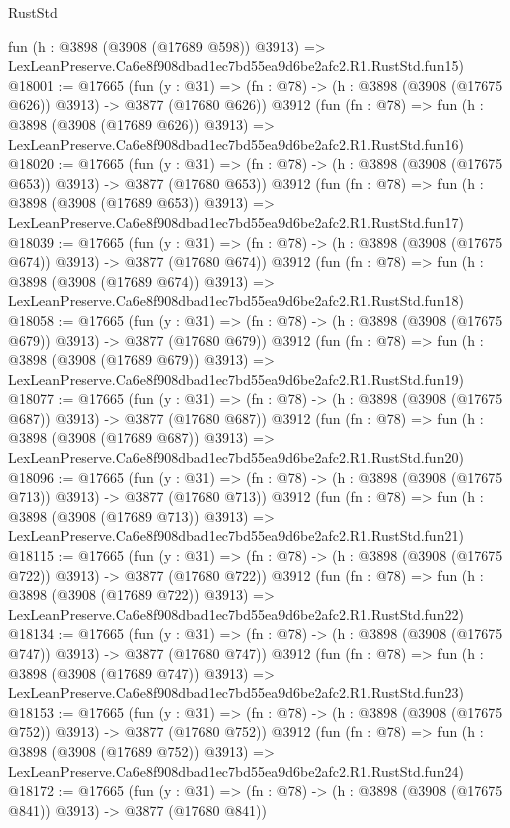 \begin{lexlean}{RustStd}
\begin{coremodule}
    fun (h : @3898 (@3908 (@17689 @598)) @3913) =>
    LexLeanPreserve.Ca6e8f908dbad1ec7bd55ea9d6be2afc2.R1.RustStd.fun15)
@18001 := @17665
    (fun (y : @31) => (fn : @78) -> (h : @3898 (@3908 (@17675 @626)) @3913) -> @3877 (@17680 @626))
    @3912
    (fun (fn : @78) =>
    fun (h : @3898 (@3908 (@17689 @626)) @3913) =>
    LexLeanPreserve.Ca6e8f908dbad1ec7bd55ea9d6be2afc2.R1.RustStd.fun16)
@18020 := @17665
    (fun (y : @31) => (fn : @78) -> (h : @3898 (@3908 (@17675 @653)) @3913) -> @3877 (@17680 @653))
    @3912
    (fun (fn : @78) =>
    fun (h : @3898 (@3908 (@17689 @653)) @3913) =>
    LexLeanPreserve.Ca6e8f908dbad1ec7bd55ea9d6be2afc2.R1.RustStd.fun17)
@18039 := @17665
    (fun (y : @31) => (fn : @78) -> (h : @3898 (@3908 (@17675 @674)) @3913) -> @3877 (@17680 @674))
    @3912
    (fun (fn : @78) =>
    fun (h : @3898 (@3908 (@17689 @674)) @3913) =>
    LexLeanPreserve.Ca6e8f908dbad1ec7bd55ea9d6be2afc2.R1.RustStd.fun18)
@18058 := @17665
    (fun (y : @31) => (fn : @78) -> (h : @3898 (@3908 (@17675 @679)) @3913) -> @3877 (@17680 @679))
    @3912
    (fun (fn : @78) =>
    fun (h : @3898 (@3908 (@17689 @679)) @3913) =>
    LexLeanPreserve.Ca6e8f908dbad1ec7bd55ea9d6be2afc2.R1.RustStd.fun19)
@18077 := @17665
    (fun (y : @31) => (fn : @78) -> (h : @3898 (@3908 (@17675 @687)) @3913) -> @3877 (@17680 @687))
    @3912
    (fun (fn : @78) =>
    fun (h : @3898 (@3908 (@17689 @687)) @3913) =>
    LexLeanPreserve.Ca6e8f908dbad1ec7bd55ea9d6be2afc2.R1.RustStd.fun20)
@18096 := @17665
    (fun (y : @31) => (fn : @78) -> (h : @3898 (@3908 (@17675 @713)) @3913) -> @3877 (@17680 @713))
    @3912
    (fun (fn : @78) =>
    fun (h : @3898 (@3908 (@17689 @713)) @3913) =>
    LexLeanPreserve.Ca6e8f908dbad1ec7bd55ea9d6be2afc2.R1.RustStd.fun21)
@18115 := @17665
    (fun (y : @31) => (fn : @78) -> (h : @3898 (@3908 (@17675 @722)) @3913) -> @3877 (@17680 @722))
    @3912
    (fun (fn : @78) =>
    fun (h : @3898 (@3908 (@17689 @722)) @3913) =>
    LexLeanPreserve.Ca6e8f908dbad1ec7bd55ea9d6be2afc2.R1.RustStd.fun22)
@18134 := @17665
    (fun (y : @31) => (fn : @78) -> (h : @3898 (@3908 (@17675 @747)) @3913) -> @3877 (@17680 @747))
    @3912
    (fun (fn : @78) =>
    fun (h : @3898 (@3908 (@17689 @747)) @3913) =>
    LexLeanPreserve.Ca6e8f908dbad1ec7bd55ea9d6be2afc2.R1.RustStd.fun23)
@18153 := @17665
    (fun (y : @31) => (fn : @78) -> (h : @3898 (@3908 (@17675 @752)) @3913) -> @3877 (@17680 @752))
    @3912
    (fun (fn : @78) =>
    fun (h : @3898 (@3908 (@17689 @752)) @3913) =>
    LexLeanPreserve.Ca6e8f908dbad1ec7bd55ea9d6be2afc2.R1.RustStd.fun24)
@18172 := @17665
    (fun (y : @31) => (fn : @78) -> (h : @3898 (@3908 (@17675 @841)) @3913) -> @3877 (@17680 @841))

\end{coremodule}
\end{lexlean}

